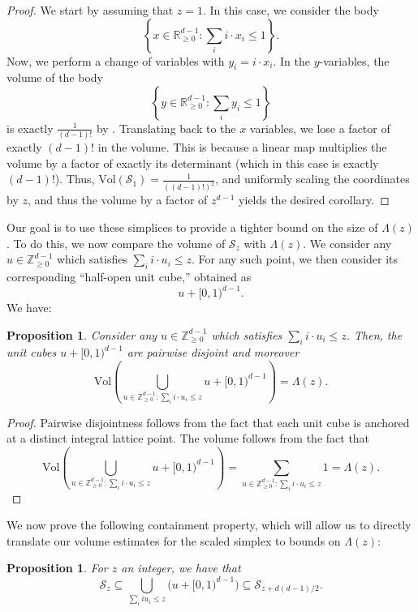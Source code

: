 \documentclass[11pt]{article}
\newtheorem{proposition}[theorem]{Proposition}
\let \cref \Cref
\begin{document}
\begin{proof}
    We start by assuming that $z = 1$. In this case, we consider the body 
    \[
    \left \{ x \in \mathbb{R}_{\geq 0}^{d-1}: \sum_i i \cdot x_i  \leq 1\right \}.
    \]
    Now, we perform a change of variables with $y_i = i \cdot x_i$. In the $y$-variables, the volume of the body 
    \[
    \left \{ y \in \mathbb{R}_{\geq 0}^{d-1}: \sum_i y_i  \leq 1\right \}
    \]
    is exactly $\frac{1}{(d-1)!}$ by \cref{prop:simplexVolume}. Translating back to the $x$ variables, we lose a factor of exactly $(d-1)!$ in the volume. This is because a linear map multiplies the volume by a factor of exactly its determinant (which in this case is exactly $(d-1)!$). Thus, $\mathrm{Vol}(\mathcal{S}_1) = \frac{1}{((d-1)!)^2}$, and uniformly scaling the coordinates by $z$, and thus the volume by a factor of $z^{d-1}$ yields the desired corollary. 
\end{proof}

Our goal is to use these simplices to provide a tighter bound on the size of $\Lambda(z)$. To do this, we now compare the volume of $\mathcal{S}_{z}$ with $\Lambda(z)$. We consider any $u \in \mathbb{Z}^{d-1}_{\geq 0}$ which satisfies $\sum_i i \cdot u_i \leq z$. For any such point, we then consider its corresponding ``half-open unit cube,'' obtained as 
\[
u + [0,1)^{d-1}.
\]
We have:

\begin{proposition}
    Consider any  $u \in \mathbb{Z}^{d-1}_{\geq 0}$ which satisfies $\sum_i i \cdot u_i \leq z$. Then, the unit cubes $u + [0,1)^{d-1}$ are pairwise disjoint and moreover 
    \[
    \mathrm{Vol} \left ( \bigcup_{u \in \mathbb{Z}^{d-1}_{\geq 0}: \sum_i i \cdot u_i \leq z}u + [0,1)^{d-1} \right ) = \Lambda(z). 
    \]
\end{proposition}

\begin{proof}
    Pairwise disjointness follows from the fact that each unit cube is anchored at a distinct integral lattice point. The volume follows from the fact that 
    \[
    \mathrm{Vol} \left ( \bigcup_{u \in \mathbb{Z}^{d-1}_{\geq 0}: \sum_i i \cdot u_i \leq z}u + [0,1)^{d-1} \right ) = \sum_{u \in \mathbb{Z}^{d-1}_{\geq 0}: \sum_i i \cdot u_i \leq z} 1 = \Lambda(z).
    \]
\end{proof}

We now prove the following containment property, which will allow us to directly translate our volume estimates for the scaled simplex to bounds on $\Lambda(z)$:
\begin{proposition}
For $z$ an integer, we have that 
\[
    \mathcal S_z
    \subseteq
    \bigcup_{\sum_i i u_i\le z}\bigl(u+[0,1)^{d-1}\bigr) \subseteq \mathcal{S}_{z + d(d-1)/2}.
    \]
\end{proposition}
\end{document}
